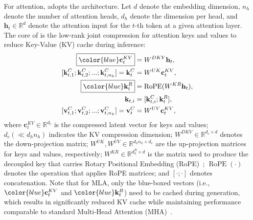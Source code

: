 For attention, \dsviii{} adopts the \dsattn{} architecture. 
Let $d$ denote the embedding dimension, $n_h$ denote the number of attention heads, $d_h$ denote the dimension per head, and $\mathbf{h}_{t} \in \mathbb{R}^{d}$ denote the attention input for the $t$-th token at a given attention layer.
The core of \dsattn{} is the low-rank joint compression for attention keys and values to reduce Key-Value (KV) cache during inference:
\begin{align}
    \boxed{\color{blue} \mathbf{c}_{t}^{KV}} &= W^{DKV} \mathbf{h}_{t}, \\
    [\mathbf{k}_{t, 1}^{C};\mathbf{k}_{t, 2}^{C};...;\mathbf{k}_{t, n_{h}}^{C}] = \mathbf{k}_{t}^{C} &= W^{UK} \mathbf{c}_{t}^{KV}, \\
    \boxed{\color{blue}\mathbf{k}_{t}^{R}} &= \operatorname{RoPE}({W^{KR}} \mathbf{h}_{t}), \\
    \mathbf{k}_{t, i} &= [\mathbf{k}_{t, i}^{C}; \mathbf{k}_{t}^{R}], \\
    [\mathbf{v}_{t, 1}^{C};\mathbf{v}_{t, 2}^{C};...;\mathbf{v}_{t, n_{h}}^{C}] = \mathbf{v}_{t}^{C} &= W^{UV} \mathbf{c}_{t}^{KV}, 
\end{align}
where $\mathbf{c}_{t}^{KV} \in \mathbb{R}^{d_c}$ is the compressed latent vector for keys and values; 
$d_c (\ll d_h n_h)$ indicates the KV compression dimension;
$W^{DKV} \in \mathbb{R}^{d_c \times d}$ denotes the down-projection matrix;
$W^{UK},W^{UV} \in \mathbb{R}^{d_h n_h \times d_c}$ are the up-projection matrices for keys and values, respectively;
$W^{KR} \in \mathbb{R}^{d_h^R \times d}$ is the matrix used to produce the decoupled key that carries Rotary Positional Embedding (RoPE)~\citep{su2024roformer}; 
$\operatorname{RoPE}(\cdot)$ denotes the operation that applies RoPE matrices; 
and $[\cdot;\cdot]$ denotes concatenation.
Note that for MLA, only the blue-boxed vectors (i.e., $\color{blue} \mathbf{c}_{t}^{KV}$ and $\color{blue}\mathbf{k}_{t}^{R}$) need to be cached during generation, which results in significantly reduced KV cache while maintaining performance comparable to standard Multi-Head Attention (MHA)~\citep{transformer}.

